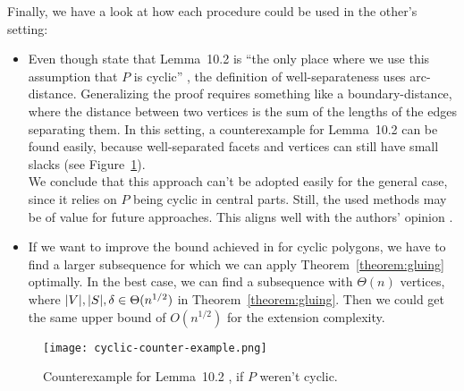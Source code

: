 Finally, we have a look at how each procedure could be used in the other's setting:

\begin{itemize}
  \item Even though \citeauthor{kwan2020extension} state that Lemma~10.2 is ``the only place where we use this assumption that $P$ is cyclic'' \cite[22]{kwan2020extension}, the definition of well-separateness uses arc-distance. Generalizing the proof requires something like a boundary-distance, where the distance between two vertices is the sum of the lengths of the edges separating them. In this setting, a counterexample for Lemma~10.2 can be found easily, because well-separated facets and vertices can still have small slacks (see Figure~\ref{fig:cyclic-counter-example}).\\
        We conclude that this approach can't be adopted easily for the general case, since it relies on $P$ being cyclic in central parts. Still, the used methods may be of value for future approaches. This aligns well with the authors' opinion \cite[28]{kwan2020extension}.
  \item If we want to improve the bound achieved in \textcite{shitov2020sublinear} for cyclic polygons, we have to find a larger subsequence for which we can apply Theorem~\ref{theorem:gluing} optimally. In the best case, we can find a subsequence with $\Theta(n)$ vertices, where $\lvert V\rvert,\lvert S\rvert,\delta \in \Theta(n^{1/2})$ in Theorem~\ref{theorem:gluing}. Then we could get the same upper bound of $O(n^{1/2})$ for the extension complexity.
\end{itemize}

\begin{figure}[ht]
  \centering
  \texttt{[image: cyclic-counter-example.png]}
  \caption{Counterexample for Lemma~10.2 \cite{kwan2020extension}, if $P$ weren't cyclic.}
  \label{fig:cyclic-counter-example}
\end{figure}
